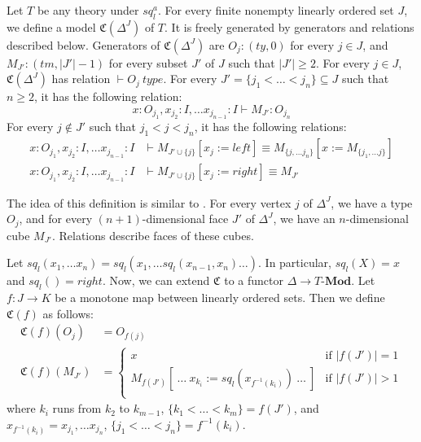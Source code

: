 \documentclass[reqno]{amsart}
\theoremstyle{definition}
\theoremstyle{remark}
\newcommand{\deq}{\equiv}
\newcommand{\repl}{:=}
\newcommand{\cat}[1]{\mathbf{#1}}
\newcommand{\Mod}[1]{#1\text{-}\cat{Mod}}
\numberwithin{figure}{section}
\begin{document}
Let $T$ be any theory under $sq^a_l$.
For every finite nonempty linearly ordered set $J$, we define a model $\mathfrak{C}(\Delta^J)$ of $T$.
It is freely generated by generators and relations described below.
Generators of $\mathfrak{C}(\Delta^J)$ are $O_j : (ty,0)$ for every $j \in J$, and $M_{J'} : (tm,|J'|-1)$ for every subset $J'$ of $J$ such that $|J'| \geq 2$.
For every $j \in J$, $\mathfrak{C}(\Delta^J)$ has relation $\vdash O_j\ type$.
For every $J' = \{ j_1 < \ldots < j_n \} \subseteq J$ such that $n \geq 2$, it has the following relation:
\[ x : O_{j_1}, x_{j_2} : I, \ldots x_{j_{n-1}} : I \vdash M_{J'} : O_{j_n} \]
For every $j \notin J'$ such that $j_1 < j < j_n$, it has the following relations:
\begin{align}
x : O_{j_1}, x_{j_2} : I, \ldots x_{j_{n-1}} : I & \vdash M_{J' \cup \{j\}}[x_j \repl left] \deq M_{\{ j, \ldots j_n \}}[x \repl M_{\{ j_1, \ldots j \}}] \label{rel:left} \\
x : O_{j_1}, x_{j_2} : I, \ldots x_{j_{n-1}} : I & \vdash M_{J' \cup \{j\}}[x_j \repl right] \deq M_{J'} \label{rel:right}
\end{align}

The idea of this definition is similar to \cite[Definition~1.1.5.1]{lurie-topos}.
For every vertex $j$ of $\Delta^J$, we have a type $O_j$,
and for every $(n+1)$-dimensional face $J'$ of $\Delta^J$, we have an $n$-dimensional cube $M_{J'}$.
Relations describe faces of these cubes.

Let $sq_l(x_1, \ldots x_n) = sq_l(x_1, \ldots sq_l(x_{n-1},x_n) \ldots )$.
In particular, $sq_l(X) = x$ and $sq_l() = right$.
Now, we can extend $\mathfrak{C}$ to a functor $\Delta \to \Mod{T}$.
Let $f : J \to K$ be a monotone map between linearly ordered sets.
Then we define $\mathfrak{C}(f)$ as follows:
\begin{align*}
\mathfrak{C}(f)(O_j) & = O_{f(j)} \\
\mathfrak{C}(f)(M_{J'}) & =
\begin{cases}
    x                                                                  & \text{if } |f(J')| = 1 \\
    M_{f(J')}[\ \ldots\ x_{k_i} \repl sq_l(x_{f^{-1}(k_i)})\ \ldots\ ] & \text{if } |f(J')| > 1 \\
\end{cases}
\end{align*}
where $k_i$ runs from $k_2$ to $k_{m-1}$, $\{ k_1 < \ldots < k_m \} = f(J')$,
and $x_{f^{-1}(k_i)} = x_{j_1}, \ldots x_{j_n}$, $\{ j_1 < \ldots < j_n \} = f^{-1}(k_i)$.
\end{document}
